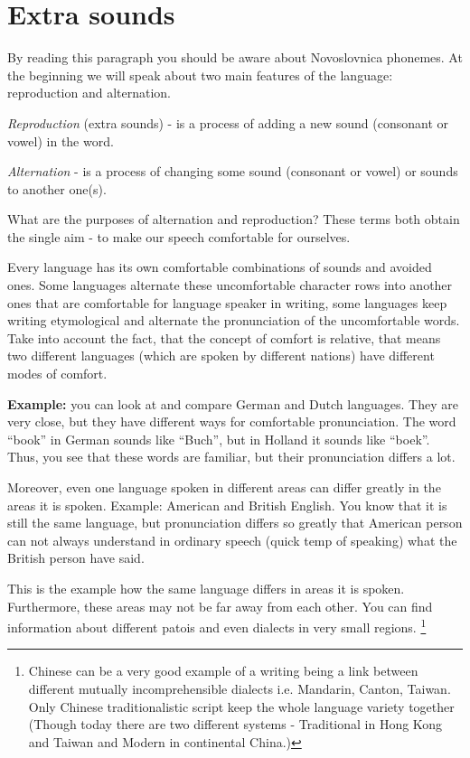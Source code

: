 \section{Extra sounds}

By reading this paragraph you should be aware about Novoslovnica phonemes. At the beginning we will speak about two main features of the language: reproduction and alternation.

\textit{Reproduction} (extra sounds) - is a process of adding a new sound (consonant or vowel) in the word.

\textit{Alternation} - is a process of changing some sound (consonant or vowel) or sounds to another one(s).

What are the purposes of alternation and reproduction? These terms both obtain the single aim - to make our speech comfortable for ourselves.

Every language has its own comfortable combinations of sounds and avoided ones. Some languages alternate these uncomfortable character rows into another ones that are comfortable for language speaker in writing, some languages keep writing etymological and alternate the pronunciation of the uncomfortable words. Take into account the fact, that the concept of comfort is relative, that means two different languages (which are spoken by different nations) have different modes of comfort.

\textbf{Example:} you can look at and compare German and Dutch languages. They are very close, but they have different ways for comfortable pronunciation. The word “book” in German sounds like “Buch”, but in Holland it sounds like “boek”. Thus, you see that these words are familiar, but their pronunciation differs a lot.

Moreover, even one language spoken in different areas can differ greatly in the areas it is spoken.
Example: American and British English. You know that it is still the same language, but pronunciation differs so greatly that American person can not always understand in ordinary speech (quick temp of speaking) what the British person have said.

This is the example how the same language differs in areas it is spoken. Furthermore, these areas may not be far away from each other. You can find information about different patois and even dialects in very small regions. \footnote{Chinese can be a very good example of a writing being a link between different mutually incomprehensible dialects i.e. Mandarin, Canton, Taiwan. Only Chinese traditionalistic script keep the whole language variety together (Though today there are two different systems - Traditional in Hong Kong and Taiwan and Modern in continental China.)} 

